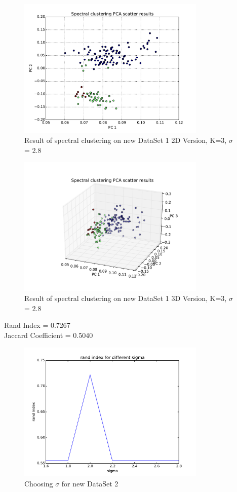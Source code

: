 \documentclass[paper=letter, fontsize=11pt]{article}
\numberwithin{equation}{section}		%
\numberwithin{figure}{section}			%
\numberwithin{table}{section}				%
\begin{document}
\begin{figure}[H]
	\centering
	\includegraphics[width=0.8\textwidth]{S_new_dataset_1_2D.pdf}
	\caption{Result of spectral clustering on new DataSet 1 2D Version, K=3, $\sigma$ = 2.8}
\end{figure}

\begin{figure}[H]
	\centering
	\includegraphics[width=0.8\textwidth]{S_new_dataset_1_3D.pdf}
	\caption{Result of spectral clustering on new DataSet 1 3D Version, K=3, $\sigma$ = 2.8}
\end{figure}
\noindent Rand Index = 0.7267\\
Jaccard Coefficient = 0.5040\\




\begin{figure}[H]
	\centering
	\includegraphics[width=0.8\textwidth]{choose_sigma_new_dataset2.pdf}
	\caption{Choosing $\sigma$ for new DataSet 2 }
\end{figure}
\end{document}

